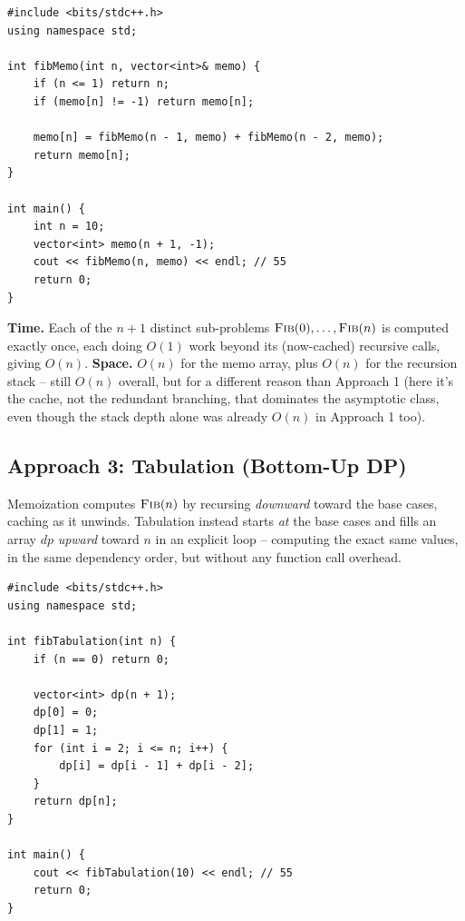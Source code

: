\begin{lstlisting}
#include <bits/stdc++.h>
using namespace std;

int fibMemo(int n, vector<int>& memo) {
    if (n <= 1) return n;
    if (memo[n] != -1) return memo[n];

    memo[n] = fibMemo(n - 1, memo) + fibMemo(n - 2, memo);
    return memo[n];
}

int main() {
    int n = 10;
    vector<int> memo(n + 1, -1);
    cout << fibMemo(n, memo) << endl; // 55
    return 0;
}
\end{lstlisting}

\begin{complexitybox}
\textbf{Time.} Each of the $n+1$ distinct sub-problems
$\textsc{Fib}(0),\ldots,\textsc{Fib}(n)$ is computed exactly once,
each doing $O(1)$ work beyond its (now-cached) recursive calls, giving
$O(n)$.
\textbf{Space.} $O(n)$ for the memo array, plus $O(n)$ for the
recursion stack -- still $O(n)$ overall, but for a different reason than
Approach 1 (here it's the cache, not the redundant branching, that
dominates the asymptotic class, even though the stack depth alone was
already $O(n)$ in Approach 1 too).
\end{complexitybox}

\subsection*{Approach 3: Tabulation (Bottom-Up DP)}

\begin{ideabox}
Memoization computes $\textsc{Fib}(n)$ by recursing \emph{downward}
toward the base cases, caching as it unwinds. Tabulation instead starts
\emph{at} the base cases and fills an array $\textit{dp}$ \emph{upward}
toward $n$ in an explicit loop -- computing the exact same values, in the
same dependency order, but without any function call overhead.
\end{ideabox}

\begin{lstlisting}
#include <bits/stdc++.h>
using namespace std;

int fibTabulation(int n) {
    if (n == 0) return 0;

    vector<int> dp(n + 1);
    dp[0] = 0;
    dp[1] = 1;
    for (int i = 2; i <= n; i++) {
        dp[i] = dp[i - 1] + dp[i - 2];
    }
    return dp[n];
}

int main() {
    cout << fibTabulation(10) << endl; // 55
    return 0;
}
\end{lstlisting}

